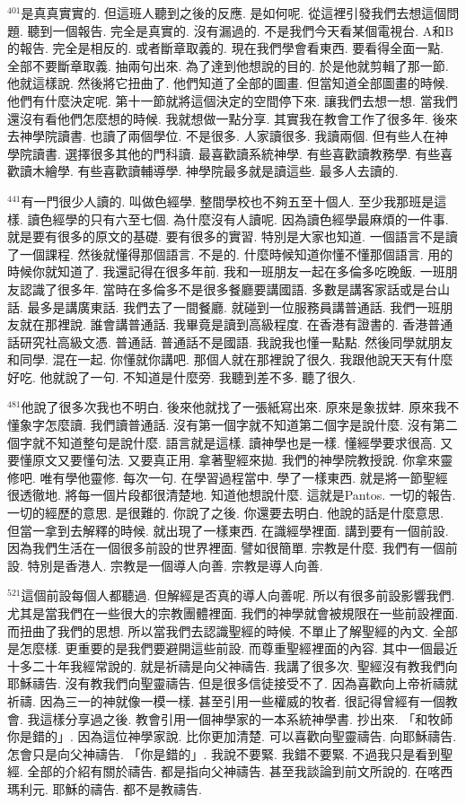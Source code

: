 \documentclass{book}
\begin{document}
$^{401}$是真真實實的.
但這班人聽到之後的反應.
是如何呢.
從這裡引發我們去想這個問題.
聽到一個報告.
完全是真實的.
沒有漏過的.
不是我們今天看某個電視台.
A和B的報告.
完全是相反的.
或者斷章取義的.
現在我們學會看東西.
要看得全面一點.
全部不要斷章取義.
抽兩句出來.
為了達到他想說的目的.
於是他就剪輯了那一節.
他就這樣說.
然後將它扭曲了.
他們知道了全部的圖畫.
但當知道全部圖畫的時候.
他們有什麼決定呢.
第十一節就將這個決定的空間停下來.
讓我們去想一想.
當我們還沒有看他們怎麼想的時候.
我就想做一點分享.
其實我在教會工作了很多年.
後來去神學院讀書.
也讀了兩個學位.
不是很多.
人家讀很多.
我讀兩個.
但有些人在神學院讀書.
選擇很多其他的門科讀.
最喜歡讀系統神學.
有些喜歡讀教務學.
有些喜歡讀木繪學.
有些喜歡讀輔導學.
神學院最多就是讀這些.
最多人去讀的.

$^{441}$有一門很少人讀的.
叫做色經學.
整間學校也不夠五至十個人.
至少我那班是這樣.
讀色經學的只有六至七個.
為什麼沒有人讀呢.
因為讀色經學最麻煩的一件事.
就是要有很多的原文的基礎.
要有很多的實習.
特別是大家也知道.
一個語言不是讀了一個課程.
然後就懂得那個語言.
不是的.
什麼時候知道你懂不懂那個語言.
用的時候你就知道了.
我還記得在很多年前.
我和一班朋友一起在多倫多吃晚飯.
一班朋友認識了很多年.
當時在多倫多不是很多餐廳要講國語.
多數是講客家話或是台山話.
最多是講廣東話.
我們去了一間餐廳.
就碰到一位服務員講普通話.
我們一班朋友就在那裡說.
誰會講普通話.
我畢竟是讀到高級程度.
在香港有證書的.
香港普通話研究社高級文憑.
普通話.
普通話不是國語.
我說我也懂一點點.
然後同學就朋友和同學.
混在一起.
你懂就你講吧.
那個人就在那裡說了很久.
我跟他說天天有什麼好吃.
他就說了一句.
不知道是什麼旁.
我聽到差不多.
聽了很久.

$^{481}$他說了很多次我也不明白.
後來他就找了一張紙寫出來.
原來是象拔蚌.
原來我不懂象字怎麼讀.
我們讀普通話.
沒有第一個字就不知道第二個字是說什麼.
沒有第二個字就不知道整句是說什麼.
語言就是這樣.
讀神學也是一樣.
懂經學要求很高.
又要懂原文又要懂句法.
又要真正用.
拿著聖經來拋.
我們的神學院教授說.
你拿來靈修吧.
唯有學他靈修.
每次一句.
在學習過程當中.
學了一樣東西.
就是將一節聖經很透徹地.
將每一個片段都很清楚地.
知道他想說什麼.
這就是Pantos.
一切的報告.
一切的經歷的意思.
是很難的.
你說了之後.
你還要去明白.
他說的話是什麼意思.
但當一拿到去解釋的時候.
就出現了一樣東西.
在識經學裡面.
講到要有一個前設.
因為我們生活在一個很多前設的世界裡面.
譬如很簡單.
宗教是什麼.
我們有一個前設.
特別是香港人.
宗教是一個導人向善.
宗教是導人向善.

$^{521}$這個前設每個人都聽過.
但解經是否真的導人向善呢.
所以有很多前設影響我們.
尤其是當我們在一些很大的宗教團體裡面.
我們的神學就會被規限在一些前設裡面.
而扭曲了我們的思想.
所以當我們去認識聖經的時候.
不單止了解聖經的內文.
全部是怎麼樣.
更重要的是我們要避開這些前設.
而尊重聖經裡面的內容.
其中一個最近十多二十年我經常說的.
就是祈禱是向父神禱告.
我講了很多次.
聖經沒有教我們向耶穌禱告.
沒有教我們向聖靈禱告.
但是很多信徒接受不了.
因為喜歡向上帝祈禱就祈禱.
因為三一的神就像一模一樣.
甚至引用一些權威的牧者.
很記得曾經有一個教會.
我這樣分享過之後.
教會引用一個神學家的一本系統神學書.
抄出來.
「和牧師你是錯的」.
因為這位神學家說.
比你更加清楚.
可以喜歡向聖靈禱告.
向耶穌禱告.
怎會只是向父神禱告.
「你是錯的」.
我說不要緊.
我錯不要緊.
不過我只是看到聖經.
全部的介紹有關於禱告.
都是指向父神禱告.
甚至我談論到前文所說的.
在喀西瑪利元.
耶穌的禱告.
都不是教禱告.
\end{document}
